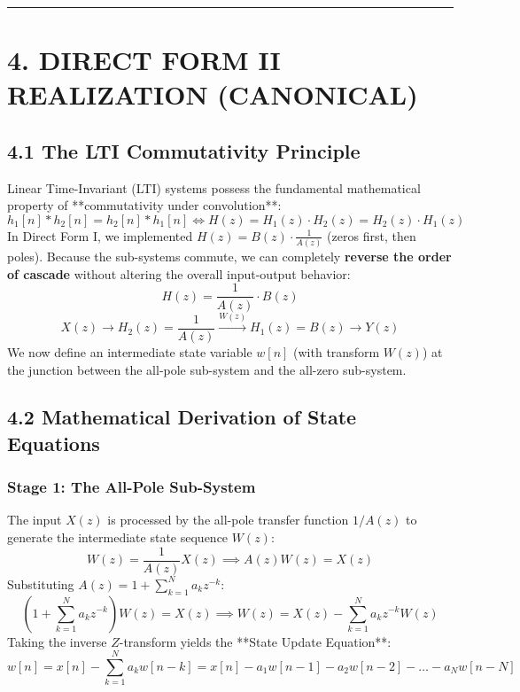 \documentclass[11pt,a4paper]{article}
\begin{document}
\noindent\rule{\textwidth}{0.5pt}

\section{4. DIRECT FORM II REALIZATION (CANONICAL)}

\subsection{4.1 The LTI Commutativity Principle}
Linear Time-Invariant (LTI) systems possess the fundamental mathematical property of **commutativity under convolution**:
\begin{equation}
h_1[n] * h_2[n] = h_2[n] * h_1[n] \iff H(z) = H_1(z) \cdot H_2(z) = H_2(z) \cdot H_1(z)
\end{equation}
In Direct Form I, we implemented $H(z) = B(z) \cdot \frac{1}{A(z)}$ (zeros first, then poles).
Because the sub-systems commute, we can completely \textbf{reverse the order of cascade} without altering the overall input-output behavior:
\begin{equation}
H(z) = \frac{1}{A(z)} \cdot B(z)
\end{equation}
\begin{equation}
X(z) \longrightarrow \boxed{H_2(z) = \frac{1}{A(z)}} \xrightarrow{W(z)} \boxed{H_1(z) = B(z)} \longrightarrow Y(z)
\end{equation}
We now define an intermediate state variable $w[n]$ (with transform $W(z)$) at the junction between the all-pole sub-system and the all-zero sub-system.

\subsection{4.2 Mathematical Derivation of State Equations}

\subsubsection{Stage 1: The All-Pole Sub-System}
The input $X(z)$ is processed by the all-pole transfer function $1/A(z)$ to generate the intermediate state sequence $W(z)$:
\begin{equation}
W(z) = \frac{1}{A(z)} X(z) \implies A(z) W(z) = X(z)
\end{equation}
Substituting $A(z) = 1 + \sum_{k=1}^N a_k z^{-k}$:
\begin{equation}
\left( 1 + \sum_{k=1}^{N} a_k z^{-k} \right) W(z) = X(z) \implies W(z) = X(z) - \sum_{k=1}^{N} a_k z^{-k} W(z)
\end{equation}
Taking the inverse $Z$-transform yields the **State Update Equation**:
\begin{equation}
w[n] = x[n] - \sum_{k=1}^{N} a_k w[n-k] = x[n] - a_1 w[n-1] - a_2 w[n-2] - \dots - a_N w[n-N]
\label{eq:df2_state_eq}
\end{equation}
\end{document}
